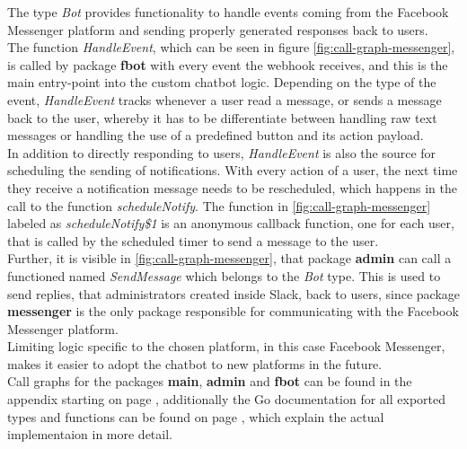 The type \emph{Bot} provides functionality to handle events coming from the Facebook Messenger platform
and sending properly generated responses back to users.
\\
The function \emph{HandleEvent}, which can be seen in figure \ref{fig:call-graph-messenger},
is called by package \textbf{fbot} with every event the webhook receives,
and this is the main entry-point into the custom chatbot logic.
Depending on the type of the event,
\emph{HandleEvent} tracks whenever a user read a message,
or sends a message back to the user,
whereby it has to be differentiate between handling raw text messages
or handling the use of a predefined button and its action payload.
\\

In addition to directly responding to users,
\emph{HandleEvent} is also the source for scheduling the sending of notifications.
With every action of a user, the next time they receive a notification message needs to be rescheduled,
which happens in the call to the function \emph{scheduleNotify}.
The function in \ref{fig:call-graph-messenger} labeled as \emph{scheduleNotify\$1} is an anonymous callback function,
one for each user, that is called by the scheduled timer to send a message to the user.
\\

Further, it is visible in \ref{fig:call-graph-messenger},
that package \textbf{admin} can call a functioned named \emph{SendMessage} which belongs to the \emph{Bot} type.
This is used to send replies, that administrators created inside Slack, back to users,
since package \textbf{messenger} is the only package responsible for communicating with the Facebook Messenger platform.
\\

Limiting logic specific to the chosen platform, in this case Facebook Messenger,
makes it easier to adopt the chatbot to new platforms in the future.
\\

Call graphs for the packages \textbf{main}, \textbf{admin} and \textbf{fbot} can be found in the appendix starting on page \pageref{a:call-graph},
additionally the Go documentation for all exported types and functions can be found on page \pageref{a:docs}, which explain the actual implementaion in more detail.
